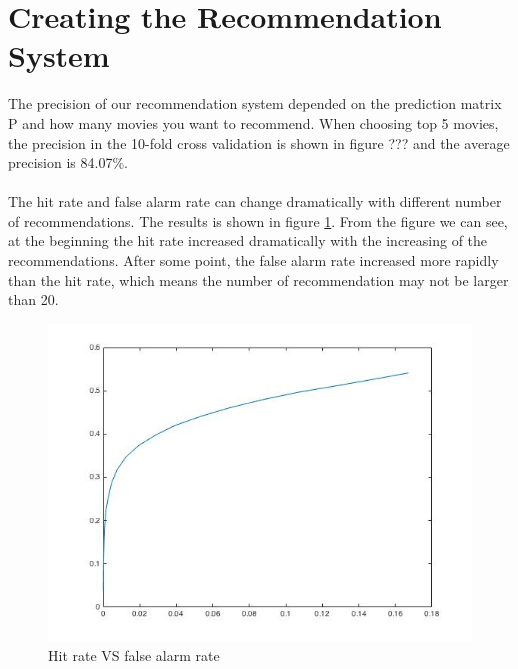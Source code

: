 \documentclass{article}
\begin{document}
\section{Creating the Recommendation System}
The precision of our recommendation system depended on the prediction matrix P and how many movies you want to recommend. When choosing top 5 movies, the precision in the 10-fold cross validation is shown in figure ??? and the average precision is 84.07\%.\\
\\
The hit rate and false alarm rate can change dramatically with different number of recommendations. The results is shown in figure \ref{fig:hit}. From the figure we can see, at the beginning the hit rate increased dramatically with the increasing of the recommendations. After some point, the false alarm rate increased more rapidly than the hit rate, which means the number of recommendation may not be larger than 20.
\begin{figure}[htbp]
\centering
\includegraphics[width=.6\textwidth]{hit_false_20.jpg}
\caption{Hit rate VS false alarm rate}
\label{fig:hit}
\end{figure}
\end{document}
